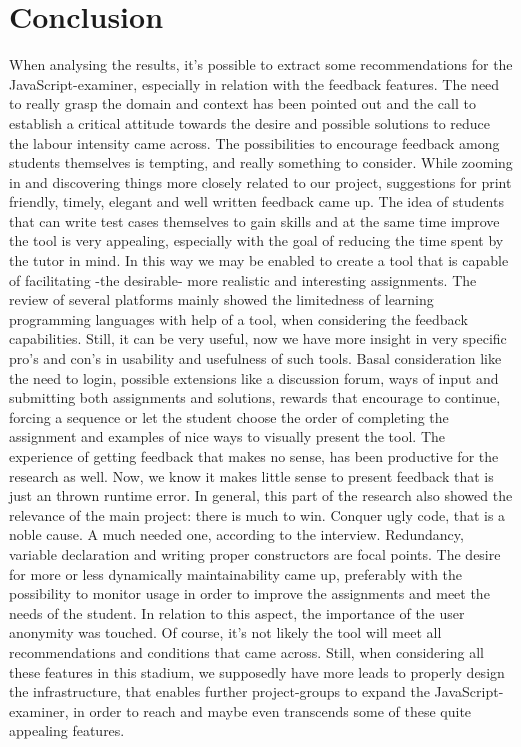 \documentclass{article}
\begin{document}
\section{Conclusion} 
When analysing the results, it's possible to extract some recommendations for 
the JavaScript-examiner, especially in relation with the feedback features. The
need to really grasp the domain and context has been pointed out and the call to
establish a critical attitude towards the desire and possible solutions
to reduce the labour intensity came across. The possibilities to encourage 
feedback among students themselves is tempting, and really something to consider.
\newline While zooming in and discovering things more closely related to our 
project, suggestions for print friendly, timely, elegant and well written 
feedback came up. The idea of students that can write test cases themselves to 
gain skills and at the same time improve the tool is very appealing, especially 
with the goal of reducing the time spent by the tutor in mind. In this way we 
may be enabled to create 
a tool that is capable of facilitating -the desirable- more realistic and 
interesting assignments. The review of several platforms mainly showed the 
limitedness of learning programming languages with help of a tool, when 
considering the feedback capabilities. Still, it can be very useful, now we have 
more insight in very specific pro's and con's in usability and usefulness of such 
tools. Basal consideration like the need to login, possible extensions like a 
discussion forum, ways of input and submitting both assignments and solutions, 
rewards that encourage to continue, forcing a sequence or let the student choose 
the order of completing the assignment and examples of nice ways to visually 
present the tool. 
The experience of getting feedback that makes no sense, has been productive for the 
research as well. Now, we know it makes little sense to present feedback that 
is just an thrown runtime error. In general, this part of the research also showed the 
relevance of the main project: there is much to win. \newline
Conquer ugly code, that is a noble cause. A much needed one, according to the
interview. Redundancy, variable declaration and writing proper constructors are
focal points. The desire for more or less dynamically maintainability came
up, preferably with the possibility to monitor usage in order to improve the 
assignments and meet the needs of the student. In relation to this aspect, the 
importance of the user anonymity was touched. \newline
Of course, it's not likely the tool will meet all recommendations and 
conditions that came across.
Still, when considering all these features in this stadium, we supposedly have 
more leads to properly design the infrastructure, that enables further 
project-groups to expand the JavaScript-examiner, in order to reach and maybe
even transcends some of these quite appealing features. 



\end{document}
